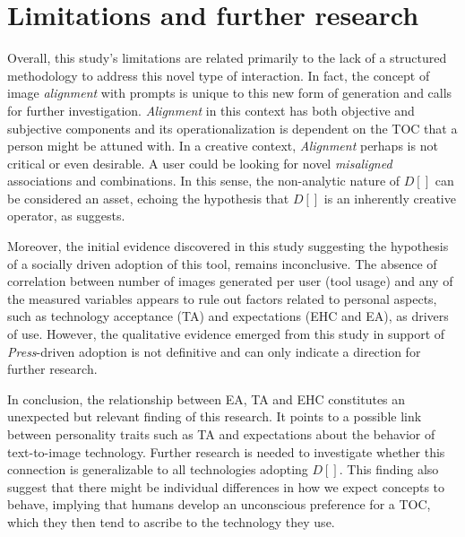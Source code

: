 \section{Limitations and further research}

Overall, this study's limitations are related primarily to the lack of a structured methodology to address this novel type of interaction. In fact, the concept of image \emph{alignment} with prompts is unique to this new form of generation and calls for further investigation. \emph{Alignment} in this context has both objective and subjective components and its operationalization is dependent on the TOC that a person might be attuned with. In a creative context, \emph{Alignment} perhaps is not critical or even desirable. A user could be looking for novel \emph{misaligned} associations and combinations. In this sense, the non-analytic nature of $D[]$ can be considered an asset, echoing the hypothesis that $D[]$ is an inherently creative operator, as \cite{Hoorn2023} suggests.

Moreover, the initial evidence discovered in this study suggesting the hypothesis of a socially driven adoption of this tool, remains inconclusive. The absence of correlation between number of images generated per user (tool usage) and any of the measured variables appears to rule out factors related to personal aspects, such as technology acceptance (TA) and expectations (EHC and EA), as drivers of use. However, the qualitative evidence emerged from this study in support of \emph{Press}-driven adoption is not definitive and can only indicate a direction for further research. 

In conclusion, the relationship between EA, TA and EHC constitutes an unexpected but relevant finding of this research. It points to a possible link between personality traits such as TA and expectations about the behavior of text-to-image technology. Further research is needed to investigate whether this connection is generalizable to all technologies adopting $D[]$. This finding also suggest that there might be individual differences in how we expect concepts to behave, implying that humans develop an unconscious preference for a TOC, which they then tend to ascribe to the technology they use.
